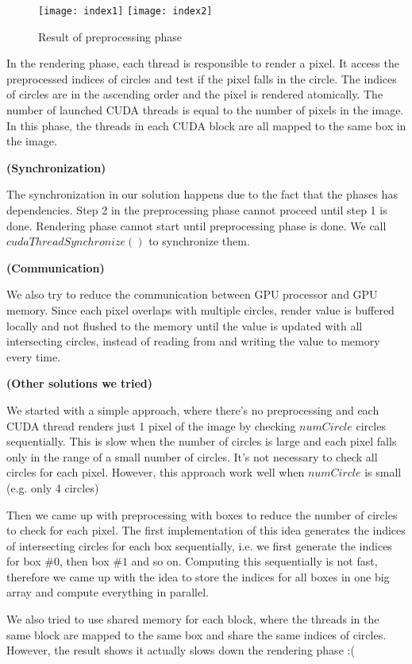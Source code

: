 \documentclass[11pt]{article}
\begin{document}
\begin{figure}[h!]
\centering
   \texttt{[image: index1]}
   \texttt{[image: index2]}
   \caption{Result of preprocessing phase }
\end{figure}

In the rendering phase, each thread is responsible to render a pixel. It access the preprocessed indices of circles and test if the pixel falls in the circle. The indices of circles are in the ascending order and the pixel is rendered atomically. The number of launched CUDA threads is equal to the number of pixels in the image. In this phase, the threads in each CUDA block are all mapped to the same box in the image.

\textbf{(Synchronization)}

The synchronization in our solution happens due to the fact that the phases has dependencies. Step 2 in the preprocessing phase cannot proceed until step 1 is done. Rendering phase cannot start until preprocessing phase is done. We call $cudaThreadSynchronize()$ to synchronize them.

\textbf{(Communication)}

We also try to reduce the communication between GPU processor and GPU memory. Since each pixel overlaps with multiple circles, render value is buffered locally and not flushed to the memory until the value is updated with all intersecting circles, instead of reading from and writing the value to memory every time.



\textbf{(Other solutions we tried)}

We started with a simple approach, where there's no preprocessing and each CUDA thread renders just 1 pixel of the image by checking $numCircle$ circles sequentially. This is slow when the number of circles is large and each pixel falls only in the range of a small number of circles. It's not necessary to check all circles for each pixel. However, this approach work well when $numCircle$ is small (e.g. only 4 circles)

Then we came up with preprocessing with boxes to reduce the number of circles to check for each pixel. The first implementation of this idea generates the indices of intersecting circles for each box sequentially, i.e. we first generate the indices for box $\#0$, then box $\#1$ and so on. Computing this sequentially is not fast, therefore we came up with the idea to store the indices for all boxes in one big array and compute everything in parallel.

We also tried to use shared memory for each block, where the threads in the same block are mapped to the same box and share the same indices of circles. However, the result shows it actually slows down the rendering phase :(

\clearpage
\end{document}
